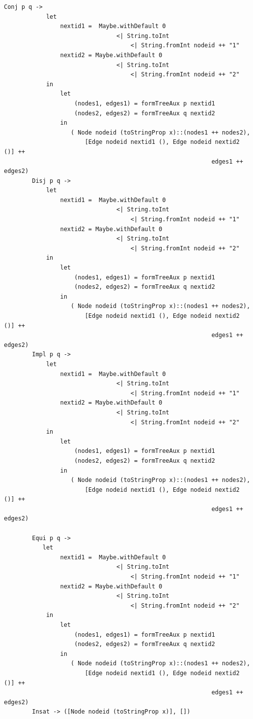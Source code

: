 \documentclass[a4paper]{report}
\begin{document}
\begin{lstlisting}[caption={Módulo SintaxSemanticsLP}, mathescape=true]
        Conj p q -> 
            let 
                nextid1 =  Maybe.withDefault 0 
                                <| String.toInt 
                                    <| String.fromInt nodeid ++ "1"
                nextid2 = Maybe.withDefault 0 
                                <| String.toInt 
                                    <| String.fromInt nodeid ++ "2"
            in
                let 
                    (nodes1, edges1) = formTreeAux p nextid1
                    (nodes2, edges2) = formTreeAux q nextid2
                in
                   ( Node nodeid (toStringProp x)::(nodes1 ++ nodes2),  
                       [Edge nodeid nextid1 (), Edge nodeid nextid2 ()] ++ 
                                                           edges1 ++ edges2)
        Disj p q -> 
            let 
                nextid1 =  Maybe.withDefault 0 
                                <| String.toInt 
                                    <| String.fromInt nodeid ++ "1"
                nextid2 = Maybe.withDefault 0 
                                <| String.toInt 
                                    <| String.fromInt nodeid ++ "2"
            in
                let 
                    (nodes1, edges1) = formTreeAux p nextid1
                    (nodes2, edges2) = formTreeAux q nextid2
                in
                   ( Node nodeid (toStringProp x)::(nodes1 ++ nodes2),  
                       [Edge nodeid nextid1 (), Edge nodeid nextid2 ()] ++ 
                                                           edges1 ++ edges2)
        Impl p q -> 
            let 
                nextid1 =  Maybe.withDefault 0 
                                <| String.toInt 
                                    <| String.fromInt nodeid ++ "1"
                nextid2 = Maybe.withDefault 0 
                                <| String.toInt 
                                    <| String.fromInt nodeid ++ "2"
            in
                let 
                    (nodes1, edges1) = formTreeAux p nextid1
                    (nodes2, edges2) = formTreeAux q nextid2
                in
                   ( Node nodeid (toStringProp x)::(nodes1 ++ nodes2),  
                       [Edge nodeid nextid1 (), Edge nodeid nextid2 ()] ++ 
                                                           edges1 ++ edges2)

        Equi p q -> 
           let 
                nextid1 =  Maybe.withDefault 0 
                                <| String.toInt 
                                    <| String.fromInt nodeid ++ "1"
                nextid2 = Maybe.withDefault 0 
                                <| String.toInt 
                                    <| String.fromInt nodeid ++ "2"
            in
                let 
                    (nodes1, edges1) = formTreeAux p nextid1
                    (nodes2, edges2) = formTreeAux q nextid2
                in
                   ( Node nodeid (toStringProp x)::(nodes1 ++ nodes2),  
                       [Edge nodeid nextid1 (), Edge nodeid nextid2 ()] ++ 
                                                           edges1 ++ edges2)
        Insat -> ([Node nodeid (toStringProp x)], [])
        

\end{lstlisting}
\end{document}
